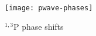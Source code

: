 \documentclass[Dissertation.tex]{subfiles}
\begin{document}
%

\begin{figure}[H]
	\centering
	\texttt{[image: pwave-phases]}
	\caption{$^{1,3}$P phase shifts}
	\label{fig:PWavePhase}
\end{figure}
\end{document}
